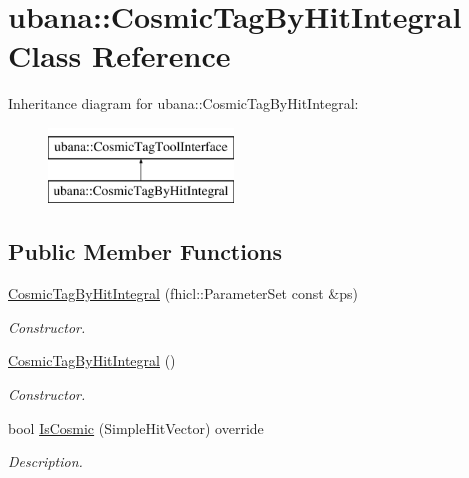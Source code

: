 \hypertarget{classubana_1_1CosmicTagByHitIntegral}{\section{ubana\-:\-:Cosmic\-Tag\-By\-Hit\-Integral Class Reference}
\label{classubana_1_1CosmicTagByHitIntegral}
}
Inheritance diagram for ubana\-:\-:Cosmic\-Tag\-By\-Hit\-Integral\-:\begin{figure}[H]
\begin{center}
\leavevmode
\includegraphics[height=2.000000cm]{classubana_1_1CosmicTagByHitIntegral}
\end{center}
\end{figure}
\subsection*{Public Member Functions}
\begin{DoxyCompactItemize}
\item 
\hypertarget{classubana_1_1CosmicTagByHitIntegral_ae58970463cfcb6fa697e19073da6a91c}{\hyperlink{classubana_1_1CosmicTagByHitIntegral_ae58970463cfcb6fa697e19073da6a91c}{Cosmic\-Tag\-By\-Hit\-Integral} (fhicl\-::\-Parameter\-Set const \&ps)}\label{classubana_1_1CosmicTagByHitIntegral_ae58970463cfcb6fa697e19073da6a91c}

\begin{DoxyCompactList}\small\item\em Constructor. \end{DoxyCompactList}\item 
\hypertarget{classubana_1_1CosmicTagByHitIntegral_ad51d5460821d3a81262f8515a8e08487}{\hyperlink{classubana_1_1CosmicTagByHitIntegral_ad51d5460821d3a81262f8515a8e08487}{Cosmic\-Tag\-By\-Hit\-Integral} ()}\label{classubana_1_1CosmicTagByHitIntegral_ad51d5460821d3a81262f8515a8e08487}

\begin{DoxyCompactList}\small\item\em Constructor. \end{DoxyCompactList}\item 
\hypertarget{classubana_1_1CosmicTagByHitIntegral_a33a59b4d8c00231b368879a591e80b5c}{bool \hyperlink{classubana_1_1CosmicTagByHitIntegral_a33a59b4d8c00231b368879a591e80b5c}{Is\-Cosmic} (Simple\-Hit\-Vector) override}\label{classubana_1_1CosmicTagByHitIntegral_a33a59b4d8c00231b368879a591e80b5c}

\begin{DoxyCompactList}\small\item\em Description. \end{DoxyCompactList}\end{DoxyCompactItemize}


